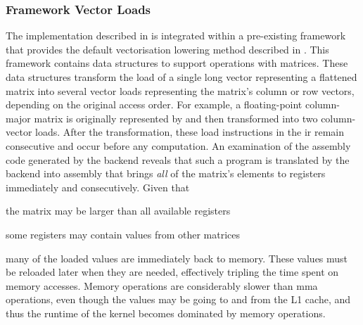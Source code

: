 \documentclass[\main/thesis.tex]{subfiles}
\begin{document}
\subsubsection{Framework Vector Loads}
The implementation described in  is integrated within a pre-existing framework that provides the default vectorisation lowering method described in .
This framework contains data structures to support operations with matrices.
These data structures transform the load of a single long vector representing a flattened matrix into several vector loads representing the matrix's column or row vectors, depending on the original access order.
For example, a floating-point column-major matrix  is originally represented by  and then transformed into two  column-vector loads.
After the transformation, these load instructions in the \gls{ir} remain consecutive and occur before any computation.
An examination of the assembly code generated by the backend reveals that such a program is translated by the backend into assembly that brings \emph{all} of the matrix's elements to registers immediately and consecutively.
Given that
\begin{enumerate*}[itemjoin={{; }}, itemjoin*={{; or }}, label=(\arabic*), after={,}]
  \item the matrix may be larger than all available registers
  \item some registers may contain values from other matrices
\end{enumerate*}
many of the loaded values are immediately  back to memory.
These values must be reloaded later when they are needed, effectively tripling the time spent on memory accesses.
Memory operations are considerably slower than \gls{mma} operations, even though the values may be going to and from the L1 cache, and thus the runtime of the kernel becomes dominated by memory operations.
\end{document}
